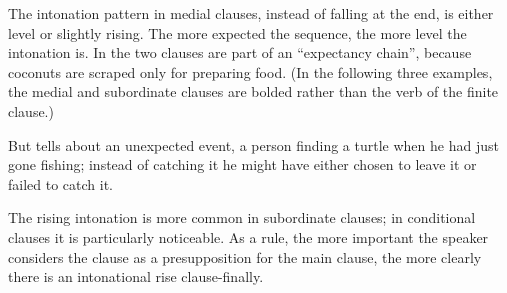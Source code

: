 The intonation pattern in medial clauses, instead of falling at the end, is either level or slightly rising.  The more expected the sequence, the more level the intonation is. In  the two clauses are part of an ``expectancy chain'', because coconuts are scraped only for preparing food. (In the following three examples, the medial and subordinate clauses are bolded rather than the verb of the finite clause.)


 


But  tells about an unexpected event, a person finding a turtle when he had just gone fishing; instead of catching it he might have either chosen to leave it or failed to catch it.

 


The rising intonation is more common in subordinate clauses; in conditional clauses  it is particularly noticeable.  As a rule, the more important the speaker considers the clause as a presupposition for the main clause, the more clearly there is an intonational rise clause-finally.  





